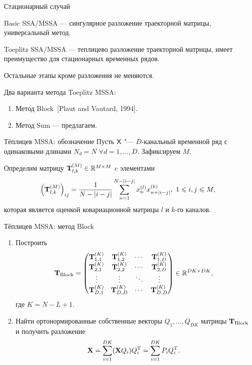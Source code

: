 \documentclass[ucs, notheorems, handout]{beamer}
\begin{document}
\begin{frame}{Стационарный случай}

Basic SSA/MSSA --- сингулярное разложение траекторной матрицы, универсальный метод.

\medskip
Toeplitz SSA/MSSA --- теплицево разложение траекторной матрицы, имеет преимущество для стационарных временных рядов. 	
	
\medskip
Остальные этапы кроме разложения не меняются.\medskip
	
	
	Два варианта метода Toeplitz MSSA:\medskip
	\begin{enumerate}
		\item Метод Block~[Plaut and Vautard, 1994].\medskip
		\item Метод Sum --- предлагаем.\medskip
	\end{enumerate}
	
\end{frame}
\begin{frame}{Тёплицев MSSA: обозначение}
	Пусть $\mathsf{X}$ "--- $D$-канальный временной ряд с одинаковыми длинами $N_d=N$ $\forall d=1,\ldots,D$. Зафиксируем $M$.\medskip
	
	Определим матрицу $\mathbf{T}_{l,k}^{(M)}\in \mathbb{R}^{M\times M}$ c элементами
	\begin{equation*}\label{eq:block_elements}
	\left(\mathbf{T}^{(M)}_{l,k}\right)_{ij}=\frac{1}{N-|i-j|}\sum_{n=1}^{N-|i-j|} x^{(l)}_nx^{(k)}_{n+|i-j|},\ 1\leqslant i,j\leqslant M,
	\end{equation*}
	которая является оценкой ковариационной матрицы $l$ и $k$-го каналов.
\end{frame}
\begin{frame}{Тёплицев MSSA: метод Block}
	\begin{enumerate}
		\item Построить $$\mathbf{T}_{\text{Block}}=\begin{pmatrix}
			\mathbf{T}^{(K)}_{1,1} & \mathbf{T}^{(K)}_{1,2} & \cdots & \mathbf{T}^{(K)}_{1,D} \\
			\mathbf{T}^{(K)}_{2,1} & \mathbf{T}^{(K)}_{2,2} & \cdots & \mathbf{T}^{(K)}_{2,D} \\
			\vdots  & \vdots  & \ddots & \vdots  \\
			\mathbf{T}^{(K)}_{D,1} & \mathbf{T}^{(K)}_{D,D} & \cdots & \mathbf{T}^{(K)}_{D,D}
		\end{pmatrix} \in \mathbb{R}^{DK\times DK},$$ где $K = N - L + 1$.\medskip
		\item Найти ортонормированные собственные векторы $Q_1,\ldots,Q_{DK}$ матрицы  $\mathbf{T}_{\text{Block}}$ и получить разложение
		\begin{equation*}
			\mathbf{X}=\sum_{i=1}^{DK} (\mathbf{X} Q_i) Q_i^\mathrm{T}=\sum_{i=1}^{DK} P_i Q_i^\mathrm{T}.
		\end{equation*}
	\end{enumerate}
\end{frame}
\end{document}
